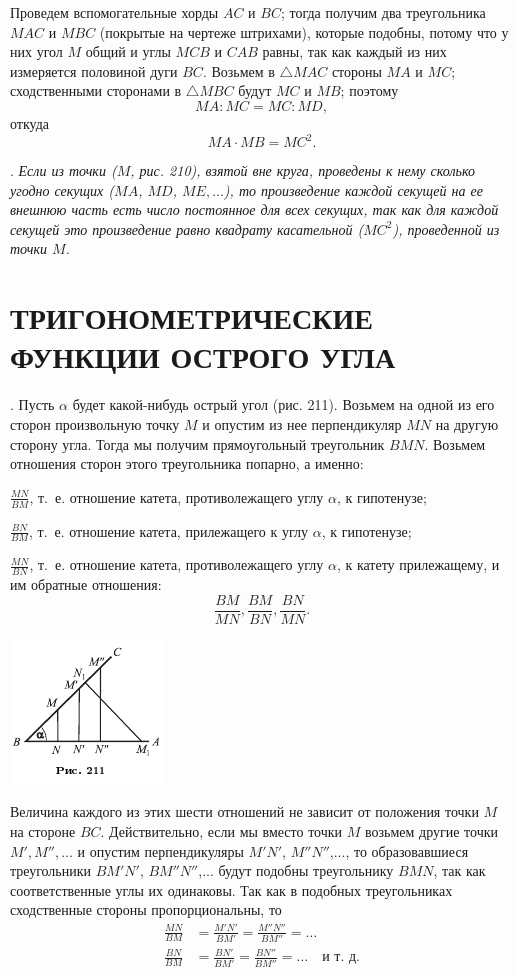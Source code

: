 \documentclass[oneside]{book}
\begin{document}
Проведем вспомогательные хорды $AC$ и $BC$;
тогда получим два треугольника $MAC$ и $MBC$ (покрытые на чертеже штрихами), которые подобны, потому что у них угол $M$ общий и углы $MCB$ и $CAB$ равны, так как каждый из них измеряется половиной дуги $BC$.
Возьмем в $\triangle MAC$ стороны $MA$ и $MC$;
сходственными сторонами в $\triangle MBC$ будут $MC$ и $MB$;
поэтому
\[MA:MC = MC:MD,\]
откуда
\[MA\cdot MB=MC^2.\]

.
\emph{Если из точки \emph{($M$, рис. 210),} взятой вне круга, проведены к нему сколько угодно секущих ($MA$, $MD$, $ME,\dots$), то произведение каждой секущей на ее внешнюю часть есть число постоянное для всех секущих, так как для каждой секущей это произведение равно квадрату касательной ($MC^2$), проведенной из точки $M$.}

\section{ТРИГОНОМЕТРИЧЕСКИЕ ФУНКЦИИ ОСТРОГО УГЛА}

.
Пусть $\alpha$ будет какой-нибудь острый угол (рис. 211).
Возьмем на одной из его сторон произвольную точку $M$ и опустим из нее перпендикуляр $MN$ на другую сторону угла.
Тогда мы получим прямоугольный треугольник $BMN$.
Возьмем отношения сторон этого треугольника попарно, а именно:

$\frac{MN}{BM}$, т.~е. отношение катета, противолежащего углу $\alpha$, к гипотенузе;

$\frac{BN}{BM}$, т.~е.
отношение катета, прилежащего к углу $\alpha$, к гипотенузе;

$\frac{MN}{BN}$, т.~е.
отношение катета, противолежащего углу $\alpha$, к катету прилежащему, и им обратные отношения:
\[\frac{BM}{MN}, \frac{BM}{BN}, \frac{BN}{MN}.\]

\includegraphics{pics/ris-211}

Величина каждого из этих шести отношений не зависит от положения точки $M$ на стороне $BC$.
Действительно, если мы вместо точки $M$ возьмем другие точки $M', M'',\dots$
и опустим перпендикуляры $M'N'$, $M''N''$,..., то образовавшиеся треугольники $BM'N'$, $BM''N''$,...
будут подобны треугольнику $BMN$, так как соответственные углы их одинаковы.
Так как в подобных треугольниках сходственные стороны пропорциональны, то 
\begin{align*}
\frac{MN}{BM}&=\frac{M'N'}{BM'}=\frac{M''N''}{BM''}=\dots
\\
\frac{BN}{BM}&=\frac{BN'}{BM'}=\frac{BN''}{BM''}=\dots\quad\text{и т.~д.}
\end{align*}
\end{document}
